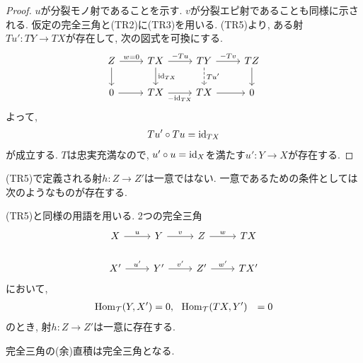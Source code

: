 \documentclass[uplatex, a4paper, 14Q, dvipdfmx]{jsarticle}
\begin{document}
\begin{proof}
  $u$が分裂モノ射であることを示す.
  $v$が分裂エピ射であることも同様に示される. 
  仮定の完全三角と(TR2)に(TR3)を用いる. 
  (TR5)より, ある射$Tu': TY \to TX$が存在して, 次の図式を可換にする. 
  \[\begin{tikzcd}
    Z & TX & TY & TZ \\
    0 & TX & TX & 0
    \arrow["{w=0}", from=1-1, to=1-2]
    \arrow["{-Tu}", from=1-2, to=1-3]
    \arrow["{-Tv}", from=1-3, to=1-4]
    \arrow[from=1-4, to=2-4]
    \arrow["{Tu'}", dashed, from=1-3, to=2-3]
    \arrow["{\id_{TX}}", from=1-2, to=2-2]
    \arrow[from=1-1, to=2-1]
    \arrow[from=2-1, to=2-2]
    \arrow["{-\id_{TX}}"', from=2-2, to=2-3]
    \arrow[from=2-3, to=2-4]
  \end{tikzcd}\]
  よって, 
  \begin{align*}
    Tu' \circ Tu = \mathrm{id}_{TX}
  \end{align*}
  が成立する. 
  $T$は忠実充満なので, $u' \circ u = \mathrm{id}_X$を満たす$u': Y \to X$が存在する. 
\end{proof}

(TR5)で定義される射$h : Z \to Z'$は一意ではない.
一意であるための条件としては次のようなものが存在する. 

\begin{lemma}
  (TR5)と同様の用語を用いる. 
  2つの完全三角
  \[\begin{tikzcd}
    X & Y & Z & TX \\
    {X'} & {Y'} & {Z'} & {TX'}
    \arrow["u", from=1-1, to=1-2]
    \arrow["v", from=1-2, to=1-3]
    \arrow["w", from=1-3, to=1-4]
    \arrow["{u'}", from=2-1, to=2-2]
    \arrow["{v'}", from=2-2, to=2-3]
    \arrow["{w'}", from=2-3, to=2-4]
  \end{tikzcd}\]
  において, 
  \begin{align*}
    \mathrm{Hom}_{\mathcal{T}}(Y,X') &= 0 , ~~\mathrm{Hom}_{\mathcal{T}}(TX,Y') &= 0
  \end{align*}
  のとき, 射$h : Z \to Z'$は一意に存在する. 
\end{lemma}

完全三角の(余)直積は完全三角となる. 
\end{document}

